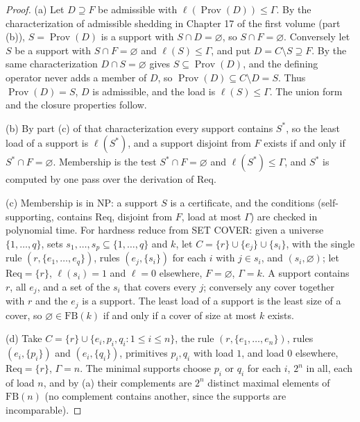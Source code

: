\begin{proof}
(a) Let $D\supseteq F$ be admissible with $\ell(\operatorname{Prov}(D))\le\Gamma$. By the characterization of admissible shedding in Chapter 17 of the first volume (part (b)), $S=\operatorname{Prov}(D)$ is a support with $S\cap D=\varnothing$, so $S\cap F=\varnothing$. Conversely let $S$ be a support with $S\cap F=\varnothing$ and $\ell(S)\le\Gamma$, and put $D=C\setminus S\supseteq F$. By the same characterization $D\cap S=\varnothing$ gives $S\subseteq\operatorname{Prov}(D)$, and the defining operator never adds a member of $D$, so $\operatorname{Prov}(D)\subseteq C\setminus D=S$. Thus $\operatorname{Prov}(D)=S$, $D$ is admissible, and the load is $\ell(S)\le\Gamma$. The union form and the closure properties follow.

(b) By part (c) of that characterization every support contains $S^{*}$, so the least load of a support is $\ell(S^{*})$, and a support disjoint from $F$ exists if and only if $S^{*}\cap F=\varnothing$. Membership is the test $S^{*}\cap F=\varnothing$ and $\ell(S^{*})\le\Gamma$, and $S^{*}$ is computed by one pass over the derivation of $\mathrm{Req}$.

(c) Membership is in NP: a support $S$ is a certificate, and the conditions (self-supporting, contains $\mathrm{Req}$, disjoint from $F$, load at most $\Gamma$) are checked in polynomial time. For hardness reduce from SET COVER: given a universe $\{1,\dots,q\}$, sets $s_1,\dots,s_p\subseteq\{1,\dots,q\}$ and $k$, let $C=\{r\}\cup\{e_j\}\cup\{s_i\}$, with the single rule $(r,\{e_1,\dots,e_q\})$, rules $(e_j,\{s_i\})$ for each $i$ with $j\in s_i$, and $(s_i,\varnothing)$; let $\mathrm{Req}=\{r\}$, $\ell(s_i)=1$ and $\ell=0$ elsewhere, $F=\varnothing$, $\Gamma=k$. A support contains $r$, all $e_j$, and a set of the $s_i$ that covers every $j$; conversely any cover together with $r$ and the $e_j$ is a support. The least load of a support is the least size of a cover, so $\varnothing\in\mathrm{FB}(k)$ if and only if a cover of size at most $k$ exists.

(d) Take $C=\{r\}\cup\{e_i,p_i,q_i:1\le i\le n\}$, the rule $(r,\{e_1,\dots,e_n\})$, rules $(e_i,\{p_i\})$ and $(e_i,\{q_i\})$, primitives $p_i,q_i$ with load $1$, and load $0$ elsewhere, $\mathrm{Req}=\{r\}$, $\Gamma=n$. The minimal supports choose $p_i$ or $q_i$ for each $i$, $2^n$ in all, each of load $n$, and by (a) their complements are $2^n$ distinct maximal elements of $\mathrm{FB}(n)$ (no complement contains another, since the supports are incomparable).
\end{proof}

